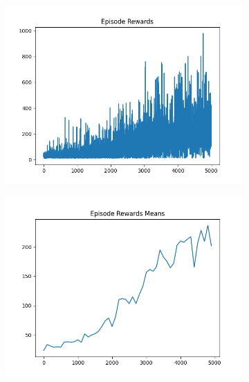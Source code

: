 \begin{figure}[H]
\begin{subfigure}{.47\linewidth}
        \includegraphics[width=\textwidth]{pole/2024-06-13_21-08-24_dqn_cartpole_episode_rewards.png}
    \end{subfigure}
    \begin{subfigure}{.47\linewidth}
        \centering
        \includegraphics[width=\textwidth]{pole/2024-06-13_21-08-24_dqn_cartpole_episode_rewards_means.png}
    \end{subfigure}
\end{figure}
